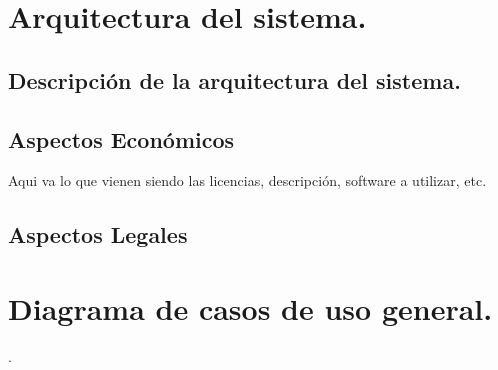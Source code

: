 \documentclass[12pt, a4paper, titlepage]{report}
\begin{document}
\section{Arquitectura del sistema.}
	        \subsection{Descripci\'on de la arquitectura del sistema.}
	        \subsection{Aspectos Econ\'omicos}
	        Aqui va lo que vienen siendo las licencias, descripción, software a utilizar, etc.
	        \subsection{Aspectos Legales}
	         
\section{Diagrama de casos de uso general.}
.
\end{document}
